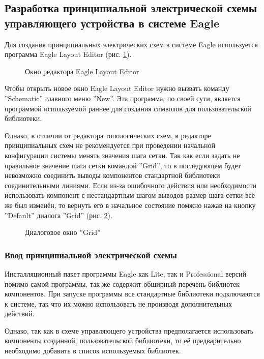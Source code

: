 \subsection{Разработка принципиальной электрической схемы управляющего устройства в системе Eagle}
Для создания принципиальных электрических схем в системе Eagle используется программа
Eagle Layout Editor (рис. \ref{img:schemeEd}).
\begin{figure}[ht]
	\caption{Окно редактора Eagle Layout Editor}
	\label{img:schemeEd}
\end{figure}

Чтобы открыть новое окно Eagle Layout Editor нужно вызвать команду ''Schematic''
главного меню ''New''. Эта программа, по своей сути, является программой используемой раннее для создания
символов для пользовательской библиотеки.

Однако, в отличии от редактора топологических схем, в редакторе принципиальных схем не рекомендуется при проведении
начальной конфигурации системы менять значения шага сетки. Так как если задать не правильное
значение шага сетки командой ''Grid'', то в последующем будет невозможно соединить выводы
компонентов стандартной библиотеки соединительными линиями. Если из-за ошибочного действия или необходимости
использовать компонент с нестандартным шагом выводов размер шага сетки всё же был изменён, то вернуть его в
начальное состояние помжно нажав на кнопку ''Default'' диалога ''Grid'' (рис. \ref{img:gridDlg}).
\begin{figure}[ht]
	\caption{Диалоговое окно ''Grid''}
	\label{img:gridDlg}
\end{figure}


\subsubsection{Ввод принципиальной электрической схемы}
Инсталляционный пакет программы Eagle как Lite, так и Professional версий помимо самой программы, так же
содержит обширный перечень библиотек компонентов. При  запуске программы все стандартные библиотеки подключаются
к системе, так что их можно использовать не производя дополнительных действий.


Однако, так как в схеме управляющего устройства предполагается использовать компоненты созданной,
пользовательской библиотеки, то её предварительно необходимо добавить в список используемых библиотек.

